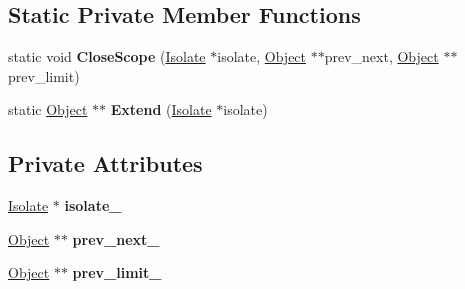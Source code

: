 \subsection*{Static Private Member Functions}
\begin{DoxyCompactItemize}
\item 
static void {\bfseries Close\+Scope} (\hyperlink{classv8_1_1internal_1_1_isolate}{Isolate} $\ast$isolate, \hyperlink{classv8_1_1internal_1_1_object}{Object} $\ast$$\ast$prev\+\_\+next, \hyperlink{classv8_1_1internal_1_1_object}{Object} $\ast$$\ast$prev\+\_\+limit)\hypertarget{classv8_1_1internal_1_1_handle_scope_aae6b9b3c8c7313a3f6de719b7e5411c8}{}\label{classv8_1_1internal_1_1_handle_scope_aae6b9b3c8c7313a3f6de719b7e5411c8}

\item 
static \hyperlink{classv8_1_1internal_1_1_object}{Object} $\ast$$\ast$ {\bfseries Extend} (\hyperlink{classv8_1_1internal_1_1_isolate}{Isolate} $\ast$isolate)\hypertarget{classv8_1_1internal_1_1_handle_scope_adef2c60e5b3b9121bee9543fa931613f}{}\label{classv8_1_1internal_1_1_handle_scope_adef2c60e5b3b9121bee9543fa931613f}

\end{DoxyCompactItemize}
\subsection*{Private Attributes}
\begin{DoxyCompactItemize}
\item 
\hyperlink{classv8_1_1internal_1_1_isolate}{Isolate} $\ast$ {\bfseries isolate\+\_\+}\hypertarget{classv8_1_1internal_1_1_handle_scope_a23e98bec07fcceda664cd02651136563}{}\label{classv8_1_1internal_1_1_handle_scope_a23e98bec07fcceda664cd02651136563}

\item 
\hyperlink{classv8_1_1internal_1_1_object}{Object} $\ast$$\ast$ {\bfseries prev\+\_\+next\+\_\+}\hypertarget{classv8_1_1internal_1_1_handle_scope_a403cba84d0849d2cc2565444fb94ee0b}{}\label{classv8_1_1internal_1_1_handle_scope_a403cba84d0849d2cc2565444fb94ee0b}

\item 
\hyperlink{classv8_1_1internal_1_1_object}{Object} $\ast$$\ast$ {\bfseries prev\+\_\+limit\+\_\+}\hypertarget{classv8_1_1internal_1_1_handle_scope_a0c6281d6d0f81866595b796854040e8c}{}\label{classv8_1_1internal_1_1_handle_scope_a0c6281d6d0f81866595b796854040e8c}

\end{DoxyCompactItemize}
